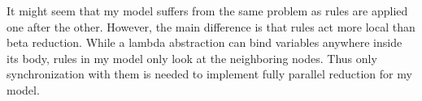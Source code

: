 It might seem that my model suffers from the same problem as rules are applied one after the other.
However, the main difference is that rules act more local than beta reduction.
While a lambda abstraction can bind variables anywhere inside its body, rules in my model only look at the neighboring nodes.
Thus only synchronization with them is needed to implement fully parallel reduction for my model.